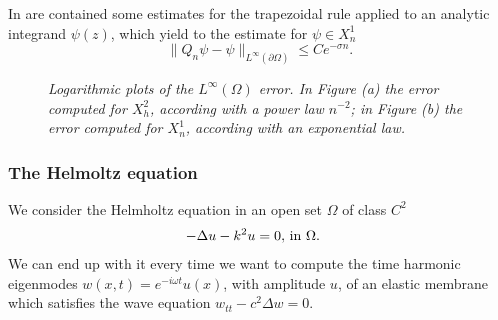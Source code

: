 \documentclass[handout]{beamer}
\begin{document}
\begin{frame}
 \frametitle{}
 In \cite{kress:book} are contained some estimates for the trapezoidal rule
applied to an analytic integrand $\psi(z)$, which yield to the estimate for $\psi\in X^1_n$
\begin{equation}
 \|Q_n\psi - \psi\|_{L^\infty(\partial\Omega)} \leq Ce^{-\sigma n}.
\end{equation}
\begin{center}
\begin{figure}
\caption{{\emph{Logarithmic plots of the $L^\infty(\Omega)$ error. In Figure (a) the error 
computed for $X^2_h$, according with a power law $n^{-2}$;
in Figure (b) the error 
computed for $X^1_n$, according with an exponential law.}}}
\label{fig:errorinfinty}
\end{figure}
\end{center}
\end{frame}
\begin{frame}
 \frametitle{The Helmoltz equation}
 We consider the Helmholtz equation 
in an open set $\Omega$ of class $C^2$
\begin{eqnarray}
 -\Delta u - k^2 u= 0, & \textup{ in }\Omega.\label{eq:helmholtz-in}
\end{eqnarray}
We can end up with it every time we want to compute the time harmonic eigenmodes
$w(x,t)=e^{-i\omega t}u(x)$, with amplitude $u$, of an elastic membrane
which satisfies the wave equation $w_{tt} - c^2 \Delta w=0$. 

\end{frame}
\end{document}
